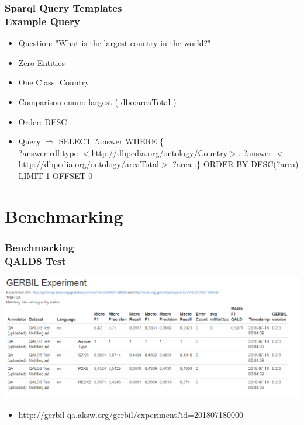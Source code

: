 \documentclass{beamer}
\newcommand\tab[1][1cm]{\hspace*{#1}}
\begin{document}
\begin{frame}
\frametitle{Sparql Query Templates \\ {\normalsize Example Query}}
\begin{example}[largest]
	\begin{itemize}
		\item Question: "What is the largest country in the world?"
		\item Zero Entities
		\item One Class: Country
		\item Comparison enum: largest ( dbo:areaTotal )
		\item Order: DESC 
		\item Query $\Rightarrow$ SELECT ?answer WHERE \{ \\
		\tab[1.4cm] 	?answer rdf:type $<$http://dbpedia.org/ontology/Country$>$. 
		\tab[1.4cm] 	?answer  $<$http://dbpedia.org/ontology/areaTotal$>$ ?area .\} 
		\tab[1.4cm] 	ORDER BY DESC(?area) LIMIT 1 OFFSET 0

	\end{itemize}
\end{example}
\end{frame}


\section{Benchmarking}

\begin{frame}
\frametitle{Benchmarking \\ {\normalsize QALD8 Test}}
\begin{center}
	\includegraphics[scale=0.38]{QALD-8-Test.PNG}
\end{center}

\begin{itemize}
	\item  http://gerbil-qa.aksw.org/gerbil/experiment?id=201807180000
\end{itemize}
\end{frame}
\end{document}
